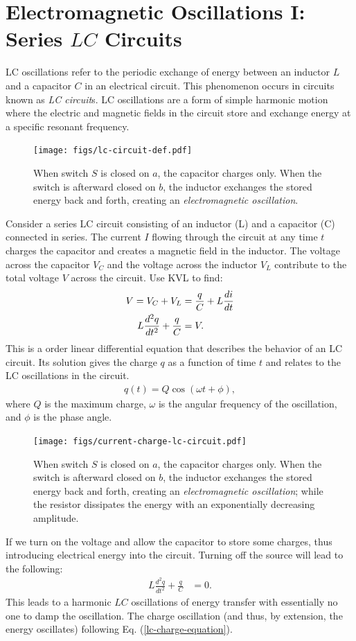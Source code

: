 \documentclass[12pt,b4paper]{article}
\begin{document}
\section{Electromagnetic Oscillations I: Series $LC$ Circuits}
LC oscillations refer to the periodic exchange of energy between an inductor $L$ and a capacitor $C$ in an electrical circuit. This phenomenon occurs in circuits known as \textit{LC circuit}s. LC oscillations are a form of simple harmonic motion where the electric and magnetic fields in the circuit store and exchange energy at a specific resonant frequency.
\begin{figure}
    \centering
    \texttt{[image: figs/lc-circuit-def.pdf]}
    \caption{When switch $S$ is closed on $a$, the capacitor charges only. When the switch is afterward closed on $b$, the inductor exchanges the stored energy back and forth, creating an \textit{electromagnetic oscillation}.}
    \label{fig:lc-circuit-def}
\end{figure}
Consider a series LC circuit consisting of an inductor (L) and a capacitor (C) connected in series. The current $I$ flowing through the circuit at any time $t$ charges the capacitor and creates a magnetic field in the inductor. The voltage across the capacitor $V_C$ and the voltage across the inductor $V_L$ contribute to the total voltage $V$ across the circuit. Use KVL to find:
\begin{align}
    V=V_C+V_L&=\frac{q}{C}+L\frac{di}{dt}\notag\\
    L\frac{d^2q}{dt^2}+\frac{q}{C}&=V.
\end{align}
This is a  order linear differential equation that describes the behavior of an LC circuit. Its solution gives the charge $q$ as a function of time $t$ and relates to the LC oscillations in the circuit.
\begin{align}
    q(t)=Q\cos{(\omega t + \phi)},\label{lc-charge-equation}
\end{align}
where $Q$ is the maximum charge, $\omega$ is the angular frequency of the oscillation, and $\phi$ is the phase angle.
\begin{figure}[H]
    \centering
    \texttt{[image: figs/current-charge-lc-circuit.pdf]}
    \caption{When switch $S$ is closed on $a$, the capacitor charges only. When the switch is afterward closed on $b$, the inductor exchanges the stored energy back and forth, creating an \textit{electromagnetic oscillation}; while the resistor dissipates the energy with an exponentially decreasing amplitude.}
    \label{fig:current-charge-lc-circuit}
\end{figure}
If we turn on the voltage and allow the capacitor to store some charges, thus introducing electrical energy into the circuit. Turning off the source will lead to the following:
\begin{align}
    L\frac{d^2q}{dt^2}+\frac{q}{C}&=0.
\end{align}
This leads to a harmonic $LC$ oscillations of energy transfer with essentially no one to damp the oscillation. The charge oscillation (and thus, by extension, the energy oscillates) following Eq. (\ref{lc-charge-equation}).
\end{document}
